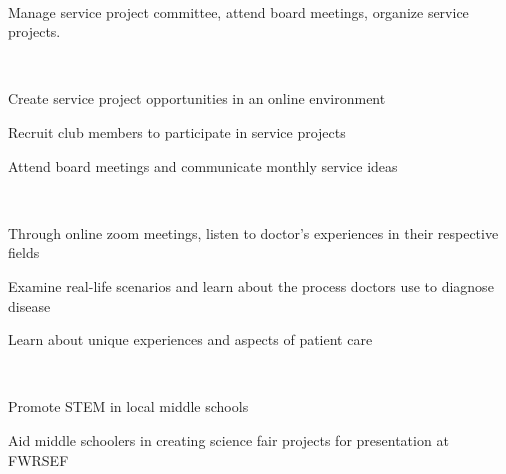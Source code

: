 \documentclass[a4paper]{MagicalCV}
\begin{document}
\begin{flushleft}
 \\
\vspace{\topsep} %
\begin{tightemize}
\item Manage service project committee, attend board meetings, organize service projects. 
\end{tightemize}
\sectionsep

 \\
\vspace{\topsep} %
\begin{tightemize}
\item Create service project opportunities in an online environment
\item Recruit club members to participate in service projects
\item Attend board meetings and communicate monthly service ideas
\end{tightemize}
\sectionsep

 \\
\vspace{\topsep} %
\begin{tightemize}
\item Through online zoom meetings, listen to doctor's experiences in their respective fields
\item Examine real-life scenarios and learn about the process doctors use to diagnose disease
\item Learn about unique experiences and aspects of patient care
\end{tightemize}
\sectionsep

 \\
\vspace{\topsep} %
\begin{tightemize}
\item Promote STEM in local middle schools
\item Aid middle schoolers in creating science fair projects for presentation at FWRSEF
\end{tightemize}
\sectionsep


\end{flushleft}
\end{document}
